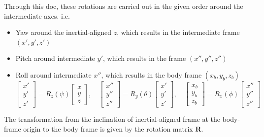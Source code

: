 \documentclass[a4paper,12pt]{article}
\begin{document}
Through this doc, these rotations are carried out in the given order around the intermediate axes. i.e.
\begin{itemize}
    \item Yaw around the inertial-aligned \( z \), which results in the intermediate frame \((x', y', z')\)
    \item Pitch around intermediate \( y' \), which results in the frame \((x'', y'', z'')\)
    \item Roll around intermediate \( x'' \), which results in the body frame \((x_b, y_b, z_b)\)
          \begin{equation} \nonumber
              \begin{bmatrix}
                  x' \\
                  y' \\
                  z'
              \end{bmatrix} = R_z(\psi)
              \begin{bmatrix}
                  x \\
                  y \\
                  z
              \end{bmatrix}, \quad
              \begin{bmatrix}
                  x'' \\
                  y'' \\
                  z''
              \end{bmatrix} = R_y(\theta)
              \begin{bmatrix}
                  x' \\
                  y' \\
                  z'
              \end{bmatrix}, \quad
              \begin{bmatrix}
                  x_b \\
                  y_b \\
                  z_b
              \end{bmatrix} = R_x(\phi)
              \begin{bmatrix}
                  x'' \\
                  y'' \\
                  z''
              \end{bmatrix}
          \end{equation}
\end{itemize}
The transformation from the inclination of inertial-aligned frame at the body-frame origin to the body frame is given by the rotation matrix \( \mathbf{R} \).
\end{document}
